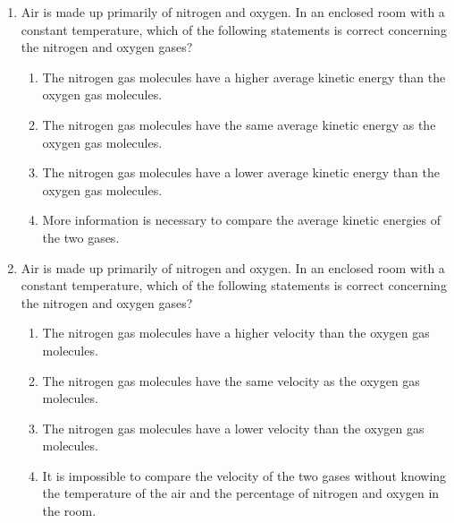\documentclass{../../../oss-apphys}
\begin{document}
\begin{multicols}{2}
\begin{enumerate}[leftmargin=18pt,start=3]
  \item Air is made up primarily of nitrogen and oxygen. In an enclosed room
    with a constant temperature, which of the following statements is
    correct concerning the nitrogen and oxygen gases?
    \begin{enumerate}[noitemsep,topsep=0pt,leftmargin=18pt,label=(\Alph*)]
    \item The nitrogen gas molecules have a higher average kinetic energy than
      the oxygen gas molecules.
    \item The nitrogen gas molecules have the same average kinetic energy as
      the oxygen gas molecules.
    \item The nitrogen gas molecules have a lower average kinetic energy than
      the oxygen gas molecules.
    \item More information is necessary to compare the average kinetic energies
      of the two gases.
    \end{enumerate}
    
  \item Air is made up primarily of nitrogen and oxygen. In an enclosed room
    with a constant temperature, which of the following statements is correct
    concerning the nitrogen and oxygen gases?
    \begin{enumerate}[noitemsep,topsep=0pt,leftmargin=18pt,label=(\Alph*)]
    \item The nitrogen gas molecules have a higher velocity than the oxygen gas
      molecules.
    \item The nitrogen gas molecules have the same velocity as the oxygen gas
      molecules.
    \item The nitrogen gas molecules have a lower velocity than the oxygen gas
      molecules.
    \item It is impossible to compare the velocity of the two gases without
      knowing the temperature of the air and the percentage of nitrogen and
      oxygen in the room.
    \end{enumerate}

    \columnbreak
    

\end{enumerate}
\end{multicols}
\end{document}
